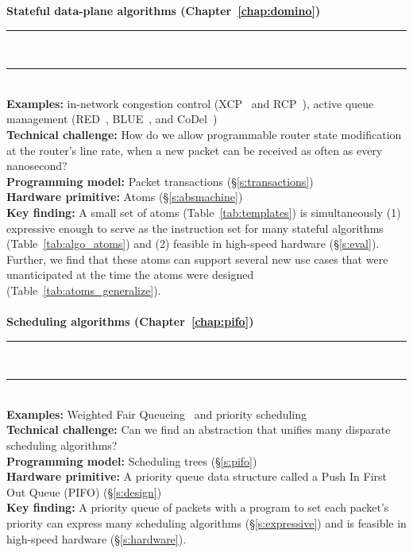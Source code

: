 \begin{table}
\textbf{Stateful data-plane algorithms (Chapter~\ref{chap:domino})}
\\[-7pt]\rule{\textwidth}{1pt}\\[-7pt]\rule{\textwidth}{1pt} \\
\textbf{Examples:} in-network congestion control (\eg XCP~\cite{xcp} and
RCP~\cite{rcp}), active queue management (\eg RED~\cite{red}, BLUE~\cite{blue},
and CoDel~\cite{codel}) \\
\textbf{Technical challenge:} How do we allow programmable router state
modification at the router's line rate, when a new packet can be received as
often as every nanosecond? \\
\textbf{Programming model:} Packet transactions (\S\ref{s:transactions})\\
\textbf{Hardware primitive:} Atoms (\S\ref{s:absmachine}) \\
\textbf{Key finding:} A small set of atoms (Table~\ref{tab:templates}) is
simultaneously (1) expressive enough to serve as the instruction set for many
stateful algorithms (Table~\ref{tab:algo_atoms}) and (2) feasible
in high-speed hardware (\S\ref{s:eval}). Further, we find that these atoms
can support several new use cases that were unanticipated at the time the atoms
were designed (Table~\ref{tab:atoms_generalize}).\\ \\

\textbf{Scheduling algorithms (Chapter~\ref{chap:pifo})}
\\[-7pt]\rule{\textwidth}{1pt}\\[-7pt]\rule{\textwidth}{1pt} \\
\textbf{Examples:} Weighted Fair Queueing~\cite{wfq} and priority scheduling~\cite{srpt} \\
\textbf{Technical challenge:} Can we find an abstraction that unifies many disparate
scheduling algorithms? \\
\textbf{Programming model:} Scheduling trees (\S\ref{s:pifo}) \\
\textbf{Hardware primitive:} A priority queue data structure called a Push In First Out
Queue (PIFO) (\S\ref{s:design}) \\
\textbf{Key finding:} A priority queue of packets with a program to set each
packet's priority can express many scheduling algorithms
(\S\ref{s:expressive}) and is feasible in high-speed hardware
(\S\ref{s:hardware}). \\\\


\end{table}
